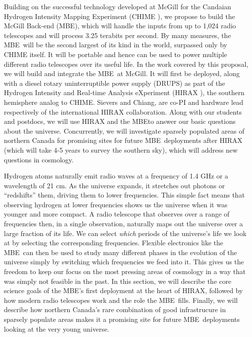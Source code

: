 \documentclass[letterpaper,11pt,preprint]{aastex}
\makeatletter
\newcommand{\mbe}{{\rm MBE}}
\def\section{\@startsection {section}{1}{\z@}{1.0ex plus 
1ex minus .2ex}{.2ex plus .2ex}{\large\bf}}
\makeatother
\begin{document}
Building on the successful technology developed at McGill for the
Candaian Hydrogen Intensity Mapping Experiment (CHIME
\citet{Bandura16}), we propose to build the McGill Back-end (\mbe),
which will handle the inputs from up to 1,024 radio telescopes and
will process 3.25 terabits per second.  By many measures, the
\mbe\ will be the second largest of its kind in the world, surpassed
only by CHIME itself.  It will be portable and hence can be used to
power multiple different radio telescopes over its useful life. In the
work covered by this proposal, we will build and integrate the
\mbe\ at McGill.  It will first be deployed, along with a diesel
rotary uninterruptible power supply (DRUPS) as part of the Hydrogen
Intensity and Real-time Analysis eXperiment (HIRAX
\citet{Newburgh16}), the southern hemisphere analog to CHIME.
Sievers and Chiang, are co-PI and hardware lead respectively of the
international HIRAX collaboration.  Along with our students and
postdocs, we will use HIRAX and the \mbe to answer our basic questions
about the universe.
Concurrently, we will investigate sparsely populated areas of northern
Canada for promising sites for future \mbe\ deployments after HIRAX
(which will take 4-5 years to survey the southern sky),
which will address new questions in cosmology.

\section{Research/Technology Development}

Hydrogen atoms naturally emit radio waves at a frequency of 1.4 GHz or
a wavelength of 21 cm.  As the universe expands, it stretches out
photons or ``redshifts'' them, driving them to lower frequencies.
This simple fact means that observing hydrogen at lower frequencies
shows us the universe when it was younger and more compact.  A radio
telescope that observes over a range of frequencies then, in a single
observation, naturally maps out the universe over a large fraction of
its life.  We can select {\it{which}} periods of the universe's life
we look at by selecting the corresponding frequencies.  Flexible
electronics like the \mbe\ can then be used to study many different
phases in the evolution of the universe simply by switching which
frequencies we feed into it.  This gives us the freedom to keep our
focus on the most pressing areas of cosmology in a way that was simply
not feasible in the past.  In this section, we will describe the core
science goals of the \mbe's first deployment at the heart of HIRAX,
followed by how modern radio telescopes work and the role the \mbe\ 
fills.  Finally, we will describe how northern Canada's rare
combination of good infrastrucure in sparsely populate areas makes it
a promising site for future \mbe\ deployments looking at the very young
universe.
\end{document}
